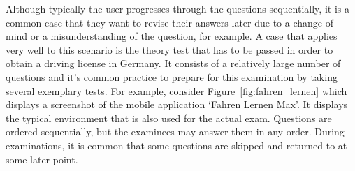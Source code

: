 \documentclass{sig-alternate-05-2015}
\begin{document}
Although typically the user progresses through the questions sequentially, it is a
common case that they want to revise their answers later due to a change of
mind or a misunderstanding of the question, for example. A case that applies very
well to this scenario is the theory test that has to be passed in order to obtain
a driving license in Germany. It consists of a relatively large number of questions and it's common practice to prepare for this examination by taking several exemplary tests. For example, consider Figure~\ref{fig:fahren_lernen} which displays a screenshot of the
mobile application `Fahren Lernen Max'. It displays the typical environment that
is also used for the actual exam. Questions are ordered sequentially, but the examinees
may answer them in any order. During examinations, it is common that some questions are
skipped and returned to at some later point.
\end{document}
